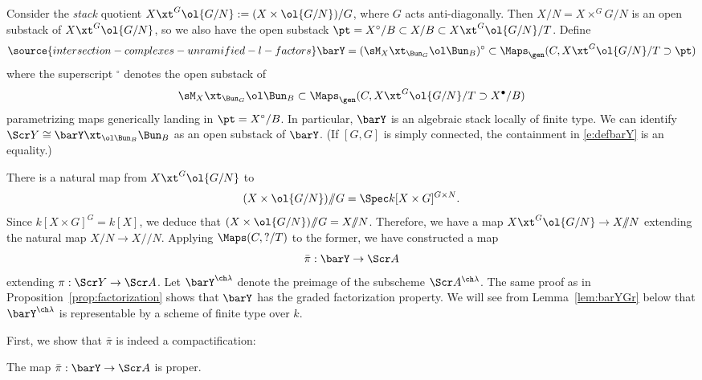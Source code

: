 Consider the \emph{stack} quotient $X \xt^G \ol{G/N} := (X\times \ol{G/N})/G$, where $G$ acts
anti-diagonally. Then $X/N = X\times^G G/N$ is an open substack of
$X \xt^G \ol{G/N}$, so we also have the open substack
$\pt = X^\circ/B \subset X/B \subset X \xt^G \ol{G/N}/T$.
Define
\begin{equation} \label{e:defbarY}
\source{intersection-complexes-unramified-l-factors}
    \barY = (\sM_X \xt_{\Bun_G} \ol \Bun_B)^\circ \subset
    \Maps_\gen( C, X \xt^G \ol{G/N}/T \supset \pt)
\end{equation}
where the superscript $^\circ$ denotes the open substack of
\[ \sM_X \xt_{\Bun_G} \ol \Bun_B \subset \Maps_\gen( C, X \xt^G \ol{G/N}/T \supset
X^\bullet / B) \]
parametrizing maps generically landing in $\pt = X^\circ/B$.
In particular, $\barY$ is an algebraic stack locally of finite type.
We can identify
$\Scr Y \cong \barY \xt_{\ol\Bun_B} \Bun_B$ as an open substack of $\barY$.
(If $[G,G]$ is simply connected, the containment in \eqref{e:defbarY} is an
equality.)

There is a natural map from $X\xt^G \ol{G/N}$ to
\[ (X \times \ol{G/N})/\!\!/G = \Spec k[X \times G]^{G \times N}. \]
Since $k[X \times G]^G = k[X]$, we deduce that $(X \times \ol{G/N})/\!\!/G = X/\!\!/N$.
Therefore, we have a map
$X \xt^G \ol{G/N} \to X/\!\!/N$ extending the natural map $X/N \to X/\!\!/N$.
Applying $\Maps(C,?/T)$ to the former, we have constructed a map
\begin{equation}
    \bar\pi : \barY \to \Scr A
\end{equation}
extending $\pi : \Scr Y \to \Scr A$.
Let $\barY^{\ch\lambda}$ denote the preimage of the subscheme $\Scr A^{\ch\lambda}$.
The same proof as in Proposition~\ref{prop:factorization}
shows that $\barY$ has the graded factorization property.
We will see from Lemma~\ref{lem:barYGr} below that $\barY^{\ch\lambda}$ is
representable by a scheme of finite type over $k$.




First, we show that $\bar\pi$ is indeed a compactification:

\begin{prop}
\notready \label{prop:piproper}
The map $\bar \pi :\barY\to \Scr A$ is proper.
\end{prop}

